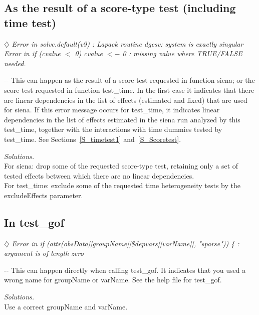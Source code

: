 \documentclass[a4paper,fleqn,11pt]{article}
\makeatletter
\newcommand{\+}{\, + \,}
\newcommand{\sfn}[1]{\textsf{#1}}
\newenvironment{indentation}[2]
{\par \setlength{\leftmargin}{#1}       \setlength{\rightmargin}{#2}
  \advance\linewidth -\leftmargin       \advance\linewidth -\rightmargin
  \advance\@totalleftmargin\leftmargin  \@setpar{{\@@par}}%
  \parshape 1 \@totalleftmargin         \linewidth \ignorespaces}{\par}
\makeatother
\begin{document}
\subsection{As the result of a score-type test (including time test)}

$\diamondsuit$
\emph{Error in solve.default(v9) :
   Lapack routine dgesv: system is exactly singular\\
Error in if (cvalue $<$ 0) cvalue $<-$ 0 :
   missing value where TRUE/FALSE needed.}
\smallskip

\begin{indentation}{0.04\textwidth}{0pt}
\noindent
This can happen as the result of a score test requested in function
\textsf{siena}; or the score test requested in function
\textsf{test\_time}.
In the first case it indicates that there are linear dependencies in the
list of effects (estimated and fixed)
that are used for \textsf{siena}.
If this error message occurs for \textsf{test\_time}, it indicates
linear dependencies in the list of effects estimated
in the \textsf{siena} run analyzed by this \textsf{test\_time},
together with the interactions with time dummies tested by
\textsf{test\_time}.
See Sections~\ref{S_timetest1} and~\ref{S_Scoretest}.
\smallskip

\noindent
\emph{Solutions.} \\
For \textsf{siena}: drop some of the requested score-type test,
retaining only a set of tested effects between which there are no
linear dependencies.\\
For \textsf{test\_time}: exclude some of the requested
time heterogeneity tests by the \sfn{excludeEffects} parameter.
\end{indentation}

\subsection{In test\_gof}

$\diamondsuit$
\emph{Error in if (attr(obsData[[groupName]]\$depvars[[varName]], "sparse")) \{ :\\
  argument is of length zero }
\smallskip

\begin{indentation}{0.04\textwidth}{0pt}
\noindent
This can happen directly when calling \textsf{test\_gof}.
It indicates that you used a wrong name for \sfn{groupName} or \sfn{varName}.
See the help file for \textsf{test\_gof}.
\smallskip

\noindent
\emph{Solutions.} \\
Use a correct \sfn{groupName} and \sfn{varName}.
\end{indentation}
\bigskip
\end{document}
